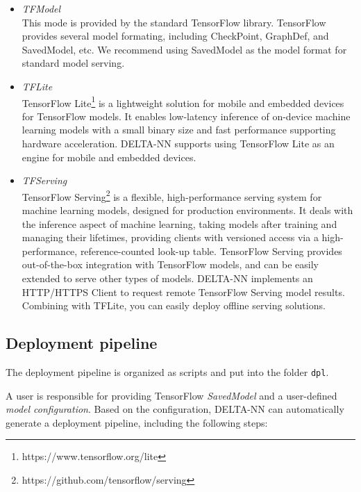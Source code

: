 \documentclass{article}
\begin{document}
\begin{itemize}
    \item \textit{TFModel} \\
    This mode is provided by the standard TensorFlow library. TensorFlow provides several model formating, including CheckPoint, GraphDef, and SavedModel, etc. We recommend using SavedModel as the model format for standard model serving.








    \item \textit{TFLite} \\
    TensorFlow Lite\footnote{https://www.tensorflow.org/lite} is a lightweight solution for mobile and embedded devices for TensorFlow models. It enables low-latency inference of on-device machine learning models with a small binary size and fast performance supporting hardware acceleration. DELTA-NN supports using TensorFlow Lite as an engine for mobile and embedded devices.

    \item \textit{TFServing} \\
    TensorFlow Serving\footnote{https://github.com/tensorflow/serving} is a flexible, high-performance serving system for machine learning models, designed for production environments. It deals with the inference aspect of machine learning, taking models after training and managing their lifetimes, providing clients with versioned access via a high-performance, reference-counted look-up table. TensorFlow Serving provides out-of-the-box integration with TensorFlow models, and can be easily extended to serve other types of models. DELTA-NN implements an HTTP/HTTPS Client to request remote TensorFlow Serving model results. Combining with TFLite, you can easily deploy offline serving solutions.


\end{itemize}


\subsection{Deployment pipeline}
The deployment pipeline is organized as scripts and put into the folder \texttt{dpl}.

A user is responsible for providing TensorFlow \textit{SavedModel} and a user-defined \textit{model configuration}. Based on the configuration, DELTA-NN can automatically generate a deployment pipeline, including the following steps:
\end{document}
